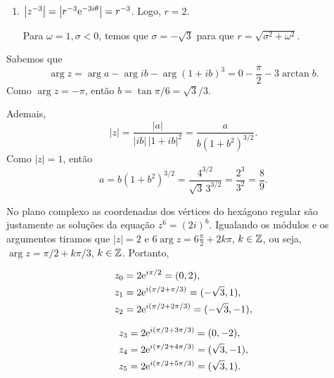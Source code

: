 \begin{questions}
\begin{solution}
\begin{enumerate}[label=(\alph*)]
  \item $\left|z^{-3}\right| = \left|r^{-3} \mathrm{e}^{-3i\theta}\right| = r^{-3}$. Logo, $r = 2$.
  
  Para $\omega = 1,\sigma < 0$, temos que $\sigma = -\sqrt{3}$ para que $r = \sqrt{\sigma^2+\omega^2}$.
\end{enumerate}
\end{solution}

\begin{solution}
Sabemos que
\[\arg z = \arg a - \arg ib - \arg (1+ib)^3 = 0 - \frac{\pi}{2} - 3\arctan b.\]
Como $\arg z = -\pi$, então $b = \tan \pi/6 = \sqrt{3}/3$.

Ademais,
\[|z| = \frac{|a|}{|ib|\,|1 + ib|^2} = \frac{a}{b(1+b^2)^{3/2}}.\]
Como $|z|=1$, então \[a = b(1+b^2)^{3/2} = \frac{4^{3/2}}{\sqrt{3}\,3^{3/2}} = \frac{2^3}{3^2} = \frac{8}{9}.\]
\end{solution}

\setcounter{question}{20}
\begin{solution}
    No plano complexo as coordenadas dos vértices do hexágono regular são justamente as soluções da equação $z^6 = (2i)^6$. Igualando os módulos e os argumentos tiramos que $|z| = 2$ e $6 \arg z = 6 \frac{\pi}{2} + 2k\pi$, $k\in{\mathbb Z}$, ou seja, $\arg z = \pi/2 + k \pi/3 $, $k\in{\mathbb Z}$. Portanto, \vspace{-10mm}
    \begin{multicols}{2}
        \begin{align*}
            z_0 &= 2 \mathrm{e}^{i \pi/2} = (0,2), \\
            z_1 &= 2 \mathrm{e}^{i (\pi/2+\pi/3)} = (-\sqrt{3},1), \\
            z_2 &= 2 \mathrm{e}^{i (\pi/2+2\pi/3)} = (-\sqrt{3},-1),
        \end{align*}
        
        \begin{align*}
            z_3 &= 2 \mathrm{e}^{i (\pi/2+3\pi/3)} = (0,-2), \\
            z_4 &= 2 \mathrm{e}^{i (\pi/2+4\pi/3)} = (\sqrt{3},-1), \\
            z_5 &= 2 \mathrm{e}^{i (\pi/2+5\pi/3)} = (\sqrt{3},1).
        \end{align*}
    \end{multicols}
    

\end{solution}
\end{questions}

